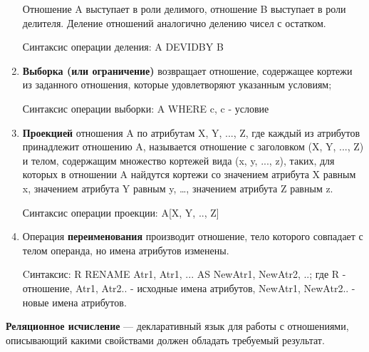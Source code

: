 \begin{enumerate}
Отношение A выступает в роли делимого, отношение B выступает в роли делителя. Деление отношений аналогично делению чисел с остатком.

Синтаксис операции деления: A DEVIDBY B


\item  \textbf{Выборка (или ограничение)} возвращает отношение, содержащее кортежи из заданного отношения, которые удовлетворяют указанным условиям;

Синтаксис операции выборки: A WHERE c, c - условие 

\item \textbf{Проекцией} отношения A по атрибутам X, Y, ..., Z, где каждый из атрибутов принадлежит отношению A, называется отношение с заголовком (X, Y, ..., Z)  и телом, содержащим множество кортежей вида (x, y, ..., z), таких, для которых в отношении A найдутся кортежи со значением атрибута X равным x, значением атрибута Y равным y, …, значением атрибута Z равным z. 

Синтаксис операции проекции: A[X, Y, .., Z]

\item Операция \textbf{переименования} производит отношение, тело которого совпадает с телом операнда, но имена атрибутов изменены. 

Cинтаксис: R RENAME Atr1, Atr1, ... AS NewAtr1, NewAtr2, ..; где R - отношение, Atr1, Atr2.. - исходные имена атрибутов, NewAtr1, NewAtr2.. - новые имена атрибутов.

\end{enumerate}

\textbf{Реляционное исчисление} — декларативный язык для работы с отношениями, описывающий какими свойствами должен обладать требуемый результат.
